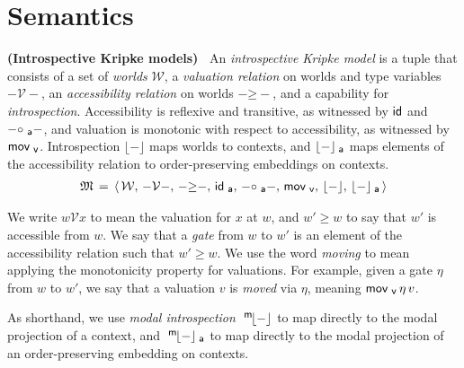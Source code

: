 \documentclass{entcs}
\numberwithin{equation}{thm}
\newcommand{\binop}[1]{-\mathord{#1}-}
\newcommand{\tsf}[1]{\textsf{\upshape{#1}}}
\newcommand{\stsf}[1]{\tsf{\small{#1}}}
\renewcommand{\:}{\mathrel{:}}
\newcommand{\id}{\operatorname{\tsf{id}}}
\newcommand{\0}{\varnothing}
\newcommand{\M}{\mathfrak{M}}
\newcommand{\W}{\mathcal{W}}
\newcommand{\V}{\mathrel{\mathcal{V}}}
\newcommand{\ida}{\operatorname{\tsf{id}_{\stsf{a}}}}
\newcommand{\compa}{\mathrel{\circ_{\stsf{a}}}}
\newcommand{\movv}{\operatorname{\tsf{mov}_{\stsf{v}}}}
\newcommand{\peek}[1]{\mathopen{\lfloor}{#1}\mathclose{\rfloor}}
\newcommand{\peeka}[1]{\mathopen{\lfloor}{#1}\mathclose{\rfloor_{\mkern-2mu\stsf{a}}}}
\newcommand{\mpeek}[1]{\mathopen{^{\stsf{m}\mkern-3mu}\lfloor}{#1}\mathclose{\rfloor}}
\newcommand{\mpeeka}[1]{\mathopen{^{\stsf{m}\mkern-3mu}\lfloor}{#1}\mathclose{\rfloor_{\mkern-2mu\stsf{a}}}}
\begin{document}
\lipsum[1-5]


\section{Semantics}

\begin{definition}
  \textbf{(Introspective Kripke models)\ }
  An \emph{introspective Kripke model} is a tuple that consists of a set of \emph{worlds} $\W$, a \emph{valuation relation} on worlds and type variables $\binop{\V}$, an \emph{accessibility relation} on worlds $\binop{\ge}$, and a capability for \emph{introspection}.
  Accessibility is reflexive and transitive, as witnessed by $\id$ and $\binop{\compa}$, and valuation is monotonic with respect to accessibility, as witnessed by $\movv$.
  Introspection $\peek{-}$ maps worlds to contexts, and $\peeka{-}$ maps elements of the accessibility relation to order-preserving embeddings on contexts.
  \begin{gather*}
    \M \,=\, \langle\, \W,\, \binop{\V},\, \binop{\ge},\, \ida,\, \binop{\compa},\, \movv,\, \peek{-},\, \peeka{-}\, \rangle
  \end{gather*}
\end{definition}

\noindent
We write $w \V x$ to mean the valuation for $x$ at $w$, and $w' \ge w$ to say that $w'$ is accessible from $w$.
We say that a \emph{gate} from $w$ to $w'$ is an element of the accessibility relation such that $w' \ge w$.
We use the word \emph{moving} to mean applying the monotonicity property for valuations.
For example, given a gate $\eta$ from $w$ to $w'$, we say that a valuation $v$ is \emph{moved} via $\eta$, meaning $\movv \eta\, v$.

As shorthand, we use \emph{modal introspection} $\mpeek{-}$ to map directly to the modal projection of a context, and $\mpeeka{-}$ to map directly to the modal projection of an order-preserving embedding on contexts.
\end{document}
